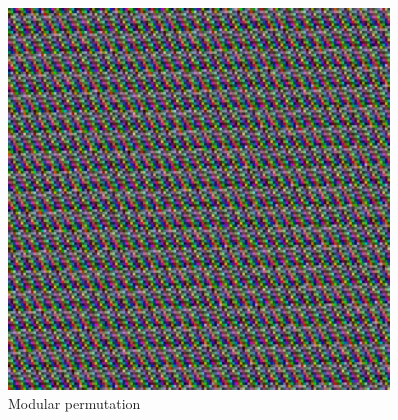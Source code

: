 \documentclass[
    parspace,
    noindent,
    nohyp,
]{elteiktdk}[2023/04/10]
\begin{document}
\begin{figure}[H]
\begin{minipage}[b]{0.45\textwidth}
    \includegraphics[width=0.9\textwidth]{image/permutation-mp1.png}
    \caption{Modular permutation}
  \end{minipage}
  \hspace*{\fill}
  
  \vspace*{0.7cm}
  

\end{figure}
\end{document}
